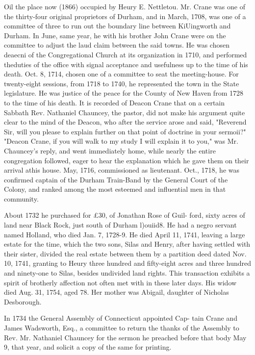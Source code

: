 Oil the place now (1866) occupied by Heury E. Nettletou. Mr. 
Crane was one of the thirty-four original proprietors of Durham, 
and in March, 1708, was one of a committee of three to run out 
the boundary line between KiUingworth and Durham. In June, 
same year, he with his brother John Crane were on the committee 
to adjust the laud claim between the said towns. He was chosen 
deaecni of the Congregational Church at its organization in 1710, 
and performed theduties of the office with signal acceptance and 
usefulness up to the time of his death. Oct. 8, 1714, chosen one 
of a committee to seat the meeting-house. For twenty-eight 
sessions, from 1718 to 1740, he represented the town in the State 
legislature. He was justice of the peace for the County of New 
Haven from 1728 to the time of his death. It is recorded of 
Deacon Crane that on a certain Sabbath Rev. Nathaniel Chauncey, 
the pastor, did not make his argument quite clear to the mind of 
the Deacon, who after the service arose and said, "Reverend Sir, 
will you please to explain further on that point of doctrine in 
your sermoii?" "Deacon Crane, if you will walk to my study I 
will explain it to you," was Mr. Chauncey's reply, and went 
immediately home, while nearly the entire congregation followed, 
eager to hear the explanation which he gave them on their arrival 
athis house. May, 1716, commissioned as lieutenant. Oct., 
1718, he was confirmed captain of the Durham Train-Band by the 
General Court of the Colony, and ranked among the most esteemed 
and influential men in that community. 

About 1732 he purchased for £30, of Jonathan Rose of Guil- 
ford, sixty acres of land near Black Rock, just south of Durham 
l)ouiid8. He had a negro servant named Holland, who died Jan. 
7, 1728-9. He died April 11, 1741, leaving a large estate for 
the time, which the two sons, Silas and Henry, after having 
settled with their sister, divided the real estate between them by 
a partition deed dated Nov. 10, 1741, granting to Heury three 
hundred and fifty-eight acres and three hundred and ninety-one 
to Silas, besides undivided land rights. This transaction exhibits 
a spirit of brotherly affection not often met with in these later 
days. His widow died Aug. 31, 1754, aged 78. Her mother 
was Abigail, daughter of Nicholas Desborough. 

In 1734 the General Assembly of Connecticut appointed Cap- 
tain Crane and James Wadsworth, Esq., a committee to return 
the thanks of the Assembly to Rev. Mr. Nathaniel Chauncey for 
the sermon he preached before that body May 9, that year, and 
solicit a copy of the same for printing. 

